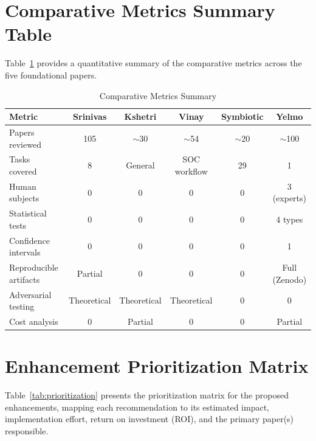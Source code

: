 \documentclass[journal]{IEEEtran}
\begin{document}
\section{Comparative Metrics Summary Table}
Table~\ref{tab:metrics} provides a quantitative summary of the comparative metrics across the five foundational papers.

\begin{table}[!t]
	\centering
	\caption{Comparative Metrics Summary}
	\label{tab:metrics}
	\begin{tabular}{|l|c|c|c|c|c|}
		\hline
		\textbf{Metric} & \textbf{Srinivas} & \textbf{Kshetri} & \textbf{Vinay} & \textbf{Symbiotic} & \textbf{Yelmo} \\
		\hline
		Papers reviewed & 105 & $\sim$30 & $\sim$54 & $\sim$20 & $\sim$100 \\
		\hline
		Tasks covered & 8 & General & SOC workflow & 29 & 1 \\
		\hline
		Human subjects & 0 & 0 & 0 & 0 & 3 (experts) \\
		\hline
		Statistical tests & 0 & 0 & 0 & 0 & 4 types \\
		\hline
		Confidence intervals & 0 & 0 & 0 & 0 & 1 \\
		\hline
		Reproducible artifacts & Partial & 0 & 0 & 0 & Full (Zenodo) \\
		\hline
		Adversarial testing & Theoretical & Theoretical & Theoretical & 0 & 0 \\
		\hline
		Cost analysis & 0 & Partial & 0 & 0 & Partial \\
		\hline
	\end{tabular}
\end{table}

\section{Enhancement Prioritization Matrix}
Table~\ref{tab:prioritization} presents the prioritization matrix for the proposed enhancements, mapping each recommendation to its estimated impact, implementation effort, return on investment (ROI), and the primary paper(s) responsible.
\end{document}
